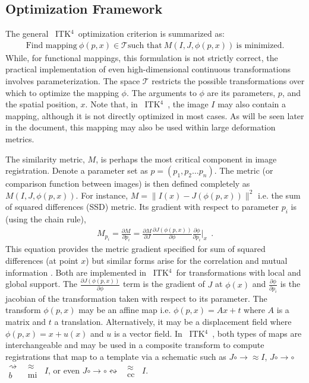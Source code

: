 \documentclass{llncs}
\newcommand{\bsp}{$\substack{
   \rightsquigarrow \\
   b
  }$}
\newcommand{\mi}{$\substack{
   \approx \\
   \text{mi}
  }$}
\newcommand{\cc}{$\substack{
   \approx \\
   \text{cc}
  }$}
\newcommand{\tk}{~ITK$^{\text{4}}$~}
\begin{document}
\subsection{Optimization Framework}
The general \tk optimization criterion is summarized as:
\begin{eqnarray}
\text{Find mapping}~\phi(p,x) \in \mathcal{T}
\text{such that}~M(I,J,\phi(p,x))~\text{is minimized}. 
\label{eq:gen}
\end{eqnarray}
While, for functional mappings, this formulation is not strictly correct, the
practical implementation of even high-dimensional continuous
transformations involves parameterization. 
The space $\mathcal{T}$ restricts the possible transformations over
which to optimize the mapping $\phi$.  The arguments to $\phi$ are its
parameters, $p$, and the spatial position, $x$.  Note that, in \tk,
the image $I$ may also contain a mapping, although it is not directly
optimized in most cases.  As will be seen later in the document, this
mapping may also be used within large deformation metrics. 

The similarity metric, $M$, is perhaps the most critical component in image registration.  
Denote a parameter set as $p = (p_1, p_2 \ldots p_n)$.  
The metric (or comparison function between images) is then defined completely as $M(I,J,\phi(p,x))$.  For instance, $M=\|
I(x)-J(\phi(p,x)) \|^2$ i.e. the sum of squared differences (SSD) metric. Its gradient with respect to parameter $p_i$
is (using the chain rule), 
\begin{eqnarray}
 M_{p_i}=\frac{\partial M}{\partial
  p_i}=\frac{\partial M}{\partial J}\frac{\partial
  J(\phi(p,x))}{\partial \phi} \frac{\partial \phi}{\partial p_i}|_x
~~.
\label{eq:grad}
\end{eqnarray}
This equation provides the metric gradient specified for
sum of squared differences (at point $x$) but similar forms arise for the correlation
and mutual information \cite{hermosillo}.  Both are implemented in
\tk for transformations with local and global support.  The
$\frac{\partial J(\phi(p,x))}{\partial \phi}$ term is the gradient of $J$ at $\phi(x)$
and $\frac{\partial \phi}{\partial p_i}$ is the jacobian of the transformation taken
with respect to its parameter.   The transform $\phi(p,x)$ may be
an affine map i.e. $\phi(p,x)=A x + t$ where $A$ is a matrix and
$t$ a translation.  Alternatively, it may be a displacement field
where $\phi(p,x)=x+u(x)$ and
$u$ is a vector field.  In \tk, both types of maps are interchangeable
and may be used in a composite transform to compute registrations that
map to a template via a schematic such as $ J  \circ \rightarrow \approx I $, $ J  \circ
\rightarrow \circ $ \bsp ~\mi~$I$, or even $ J  \circ
\rightarrow \circ \leftrightsquigarrow $~\cc~$ I $.  
\end{document}
